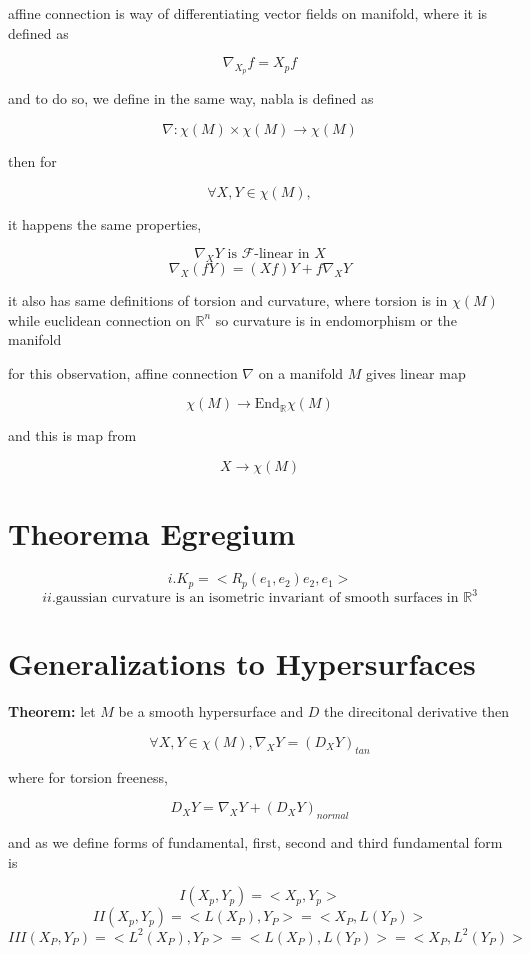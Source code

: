 \documentclass{article}
\begin{document}
affine connection is way of differentiating vector fields on manifold, where it is defined as

\[
\nabla_{X_p}f=X_pf
\]

and to do so, we define in the same way, nabla is defined as

\[
\nabla :\chi(M) \times \chi(M) \rightarrow \chi(M)
\]

then for

\[
\forall X,Y\in \chi(M), 
\]

it happens the same properties,

\[
\nabla_XY \text{ is } \mathcal{F}\text{-linear in } X
\]
\[
\nabla_X(fY)=(Xf)Y+f\nabla_XY
\]

it also has same definitions of torsion and curvature, where torsion is in $\chi(M)$ while euclidean connection on $\mathbb{R}^n$ so curvature is in endomorphism or the manifold

for this observation, affine connection $\nabla$ on a manifold $M$ gives linear map

\[
\chi(M)\rightarrow \text{End}_{\mathbb{R}}\chi(M)
\]

and this is map from

\[
X\rightarrow \chi(M)
\]

\section*{Theorema Egregium}

\[
i. K_p=<R_p(e_1,e_2)e_2,e_1>
\]
\[
ii. \text{gaussian curvature is an isometric invariant of smooth surfaces in }\mathbb{R}^3
\]

\section*{Generalizations to Hypersurfaces}

\textbf{Theorem:} let $M$ be a smooth hypersurface and $D$ the direcitonal derivative then

\[
\forall X,Y\in \chi(M), \nabla_XY=(D_XY)_{tan}
\]

where for torsion freeness, 

\[
D_XY=\nabla_XY+(D_XY)_{normal}
\]

and as we define forms of fundamental, first, second and third fundamental form is 

\[
I(X_p,Y_p)=<X_p,Y_p>
\]
\[
II(X_p,Y_p)=<L(X_P),Y_P>=<X_P,L(Y_P)>
\]
\[
III(X_P,Y_P)=<L^2(X_P),Y_P>=<L(X_P),L(Y_P)>=<X_P,L^2(Y_P)>
\]
\end{document}
